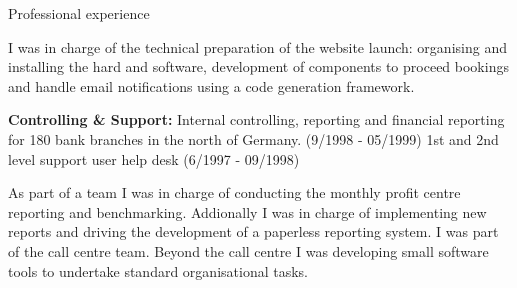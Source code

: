\begin{rubric}{Professional experience}



I was in charge of the technical preparation of the website launch: organising and installing the hard and software, development of components to proceed bookings and handle email notifications using a code generation framework.

\entry*[06/1997 - 05/1999] \textbf{Controlling \& Support:}\newline
{} 
Internal controlling, reporting and financial reporting for 180 bank branches in the north of Germany. (9/1998 - 05/1999)
1st and 2nd level support user help desk (6/1997 - 09/1998)

As part of a team I was in charge of conducting the monthly profit centre reporting and benchmarking. Addionally I was in charge of implementing new reports and driving the development of a paperless reporting system. 
I was part of the call centre team. Beyond the call centre I was developing small software tools to undertake standard organisational tasks. 

\sloppy
\end{rubric}
